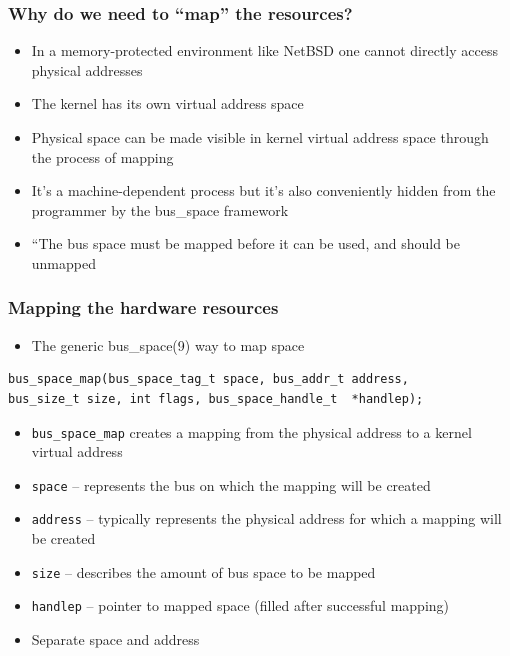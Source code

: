 \documentclass[dvipsnames,table]{beamer}
\begin{document}
\begin{frame}
\frametitle{Why do we need to ``map'' the resources?}
\begin{itemize}
	\item In a memory-protected environment like NetBSD one cannot directly access physical addresses
	\item The kernel has its own virtual address space
	\item Physical space can be made visible in kernel virtual address space through the process of mapping
	\item It's a machine-dependent process but it's also conveniently hidden from the programmer by the bus\_space framework
	\item ``The bus space must be mapped before it can be used, and should be unmapped
\end{itemize}
\end{frame}


\begin{frame}[fragile]
\frametitle{Mapping the hardware resources}

\begin{itemize}
	\item The generic bus\_space(9) way to map space
\end{itemize}

\begin{verbatim}
bus_space_map(bus_space_tag_t space, bus_addr_t address, 
bus_size_t size, int flags, bus_space_handle_t  *handlep);
\end{verbatim}

\begin{itemize}
	\item {\tt bus\_space\_map} creates a mapping from the physical address to a kernel virtual address
    \item {\tt space} -- represents the bus on which the mapping will be created
    \item {\tt address} -- typically represents the physical address for which a mapping will be created
	\item {\tt size} -- describes the amount of bus space to be mapped
	\item {\tt handlep} -- pointer to mapped space (filled after successful mapping)
    \item Separate space and address
\end{itemize}
\end{frame}
\end{document}
